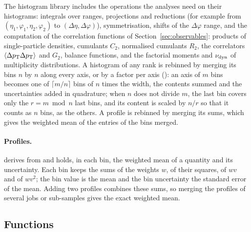 The histogram library includes the operations the analyses need on their histograms: integrals over ranges,
projections and reductions (for example from $(\eta_1,\varphi_1,\eta_2,\varphi_2)$ to $(\Delta\eta,\Delta\varphi)$), symmetrisation, shifts of the $\Delta\varphi$ range, and the computation of the correlation functions of Section~\ref{sec:observables}: products of single-particle densities, cumulants $C_2$, normalised cumulants $R_2$, the correlators $\left\langle \Delta p_{\mathrm{T}}\Delta p_{\mathrm{T}} \right\rangle$ and $G_2$, balance functions, and the factorial moments and $\nu_{\mathrm{dyn}}$ of multiplicity distributions. A histogram of any rank is rebinned by merging its bins $n$ by $n$ along every axis, or by a factor per axis
(): an axis of $m$ bins becomes one of $\lceil m/n\rceil$ bins of $n$ times the width, the
contents summed and the uncertainties added in quadrature; when $n$ does not divide $m$, the last bin covers only the
$r = m \bmod n$ last bins, and its content is scaled by $n/r$ so that it counts as $n$ bins, as the others. A profile
is rebinned by merging its sums, which gives the weighted mean of the entries of the bins merged.

\paragraph{Profiles.}
 derives from  and holds, in each bin, the weighted mean of a quantity and its
uncertainty. Each bin keeps the sums of the weights $w$, of their squares, of $w v$ and of $w v^2$; the bin value is
the mean and the bin uncertainty the standard error of the mean. Adding two profiles combines these sums, so
merging the profiles of several jobs or sub-samples gives the exact weighted mean.

\subsection{Functions}
\label{sec:functions}

